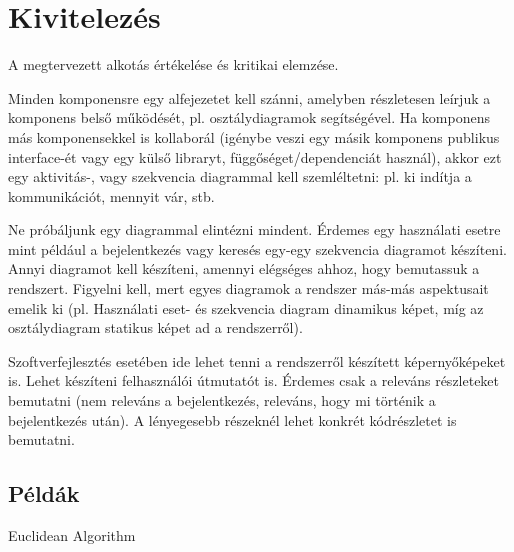 \chapter{Kivitelezés}


A megtervezett alkotás értékelése és kritikai elemzése.

Minden komponensre egy alfejezetet kell szánni, amelyben részletesen leírjuk a komponens belső működését, pl. osztálydiagramok segítségével.
Ha komponens más komponensekkel is kollaborál (igénybe veszi egy másik komponens publikus interface-ét vagy egy külső libraryt, függőséget/dependenciát használ), akkor ezt egy aktivitás-, vagy szekvencia diagrammal kell szemléltetni: pl. ki indítja a kommunikációt, mennyit vár, stb.


Ne próbáljunk egy diagrammal elintézni mindent. Érdemes egy használati esetre mint például a bejelentkezés vagy keresés egy-egy szekvencia diagramot készíteni. Annyi diagramot kell készíteni, amennyi elégséges ahhoz, hogy bemutassuk a rendszert. Figyelni kell, mert egyes diagramok a rendszer más-más aspektusait emelik ki (pl. Használati eset- és szekvencia diagram dinamikus képet, míg az osztálydiagram statikus képet ad a rendszerről).


Szoftverfejlesztés esetében ide lehet tenni a rendszerről készített képernyőképeket is. Lehet készíteni felhasználói útmutatót is. Érdemes csak a releváns részleteket bemutatni (nem releváns a bejelentkezés, releváns, hogy  mi történik a bejelentkezés után). A lényegesebb részeknél lehet konkrét kódrészletet is bemutatni. 





\section{P\'eld\'ak}

\begin{center}
	\begin{algorithm}[H]
		 
		\caption{Euclidean Algorithm}
	\end{algorithm}
\end{center}







